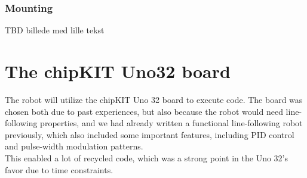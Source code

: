 \subsubsection{Mounting}

TBD billede med lille tekst





\section{The chipKIT Uno32 board}
The robot will utilize the chipKIT Uno 32 board to execute code. The board
was chosen both due to past experiences, but also because the robot would need
line-following properties, and we had already written a functional line-following robot
previously, which also included some important features, including PID control and 
pulse-width modulation patterns. \\
This enabled a lot of recycled code, which was a strong point
in the Uno 32's favor due to time constraints. \\

